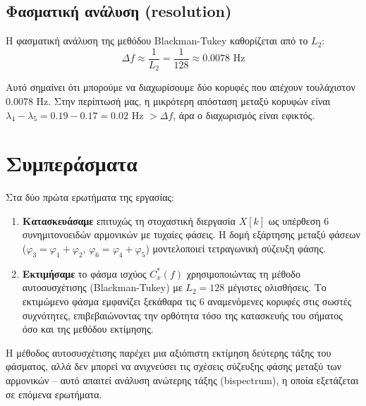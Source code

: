 \documentclass[a4paper,12pt]{article}
\begin{document}
\subsection{Φασματική ανάλυση (resolution)}

Η φασματική ανάλυση της μεθόδου Blackman-Tukey καθορίζεται από το $L_2$:
\begin{equation}
    \Delta f \approx \frac{1}{L_2} = \frac{1}{128} \approx 0.0078 \text{ Hz}
\end{equation}

Αυτό σημαίνει ότι μπορούμε να διαχωρίσουμε δύο κορυφές που απέχουν τουλάχιστον 0.0078 Hz. Στην περίπτωσή μας, η μικρότερη απόσταση μεταξύ κορυφών είναι $\lambda_4 - \lambda_5 = 0.19 - 0.17 = 0.02$ Hz $> \Delta f$, άρα ο διαχωρισμός είναι εφικτός.

\newpage
\section{Συμπεράσματα}

Στα δύο πρώτα ερωτήματα της εργασίας:

\begin{enumerate}
    \item \textbf{Κατασκευάσαμε} επιτυχώς τη στοχαστική διεργασία $X[k]$ ως υπέρθεση 6 συνημιτονοειδών αρμονικών με τυχαίες φάσεις. Η δομή εξάρτησης μεταξύ φάσεων ($\varphi_3 = \varphi_1 + \varphi_2$, $\varphi_6 = \varphi_4 + \varphi_5$) μοντελοποιεί τετραγωνική σύζευξη φάσης.

    \item \textbf{Εκτιμήσαμε} το φάσμα ισχύος $C_x^*(f)$ χρησιμοποιώντας τη μέθοδο αυτοσυσχέτισης (Blackman-Tukey) με $L_2 = 128$ μέγιστες ολισθήσεις. Το εκτιμώμενο φάσμα εμφανίζει ξεκάθαρα τις 6 αναμενόμενες κορυφές στις σωστές συχνότητες, επιβεβαιώνοντας την ορθότητα τόσο της κατασκευής του σήματος όσο και της μεθόδου εκτίμησης.
\end{enumerate}

Η μέθοδος αυτοσυσχέτισης παρέχει μια αξιόπιστη εκτίμηση δεύτερης τάξης του φάσματος, αλλά δεν μπορεί να ανιχνεύσει τις σχέσεις σύζευξης φάσης μεταξύ των αρμονικών -- αυτό απαιτεί ανάλυση ανώτερης τάξης (bispectrum), η οποία εξετάζεται σε επόμενα ερωτήματα.
\end{document}
